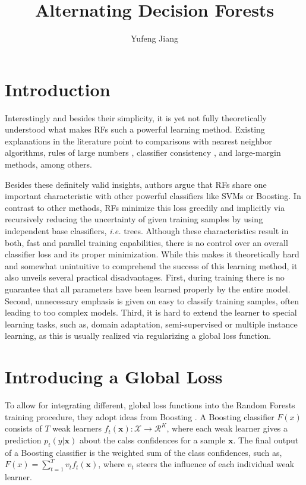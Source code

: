 \documentclass[10pt,twocolumn,letterpaper]{article}
\begin{document}
\title{Alternating Decision Forests}
\author{Yufeng Jiang}
\maketitle
\balance

\section{Introduction}

Interestingly and besides their simplicity, it is yet not fully theoretically understood what makes RFs such a powerful learning method. Existing explanations in the literature point to comparisons with nearest neighbor algorithms, rules of large numbers \cite{Random}, classifier consistency \cite{Consistency}, and large-margin methods, among others.

Besides these definitely valid insights, authors argue that RFs share one important characteristic with other powerful classifiers like SVMs or Boosting. In contrast to other methods, RFs minimize this loss greedily and implicitly via recursively reducing the uncertainty of given training samples by using independent base classifiers, \emph{i.e.} trees. Although these characteristics result in both, fast and parallel training capabilities, there is no control over an overall classifier loss and its proper minimization. While this makes it theoretically hard and somewhat unintuitive to comprehend the success of this learning method, it also unveils several practical disadvantages. First, during training there is no guarantee that all parameters have been learned properly by the entire model. Second, unnecessary emphasis is given on easy to classify training samples, often leading to too complex models. Third, it is hard to extend the learner to special learning tasks, such as, domain adaptation, semi-supervised or multiple instance learning, as this is usually realized via regularizing a global loss function.

\section{Introducing a Global Loss}

To allow for integrating different, global loss functions into the Random Forests training procedure, they adopt ideas from Boosting \cite{Experiments}. A Boosting classifier $F(x)$ consists of $T$ weak learners $f_t(\mathbf{x}) : \mathcal{X} \to \mathcal{R}^K$, where each weak learner gives a prediction $p_t(y|\mathbf{x})$ about the calss confidences for a sample $\mathbf{x}$. The final output of a Boosting classifier is the weighted sum of the class confidences, such as, $F(x) = \sum_{t=1}^Tv_tf_t(\mathbf{x})$, where $v_t$ steers the influence of each individual weak learner.
\end{document}
